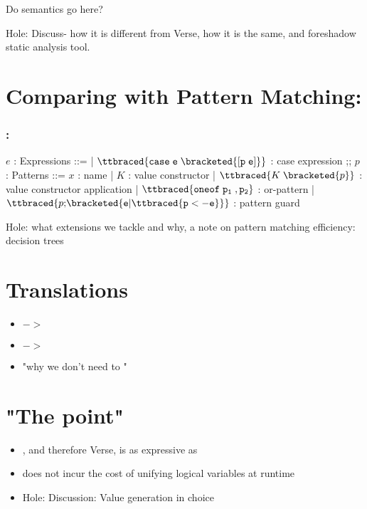 \documentclass[]{article}
\begin{document}
    Do semantics go here? 

    Hole: Discuss- how it is different from Verse, how it is the same, and
    foreshadow static analysis tool. 
\section{Comparing with Pattern Matching: \Pplus}

\subsubsection{\Pplus:}
\begin{center}
    \begin{bnf}
$e$ : \textsf{Expressions} ::=
    | $\ttbraced{\tt{case} \; e \; \bracketed{\tt{[} p \; e \tt{]}}}$ : case expression 
    ;;
    $p$ : \textsf{Patterns} ::= $x$ : name 
    | $K$ : value constructor 
    | $\ttbraced{K \; \bracketed{p}}$ : value constructor application 
    | $\ttbraced{\tt{oneof} \; p_{1} \;, p_{2} }$ : or-pattern 
    | $\ttbraced{p \tt{;} \bracketed{e \vert \ttbraced{p  <- e}}}$ : pattern guard
    \end{bnf}
\end{center}
    Hole: what extensions we tackle and why, a note on pattern matching
     efficiency: decision trees

\section{Translations}

\begin{itemize}
    \item \Pplus $->$ \Vminus 
    \item \Vminus $->$ \D
    \item "why we don't need \Pplus to \D"
\end{itemize}

\section{"The point"}


\begin{itemize}
    \item \Vminus, and therefore Verse, is as expressive as \Pplus
    \item \Vminus does not incur the cost of unifying logical variables at runtime 
    \item Hole: Discussion: Value generation in choice 
\end{itemize}
\end{document}
